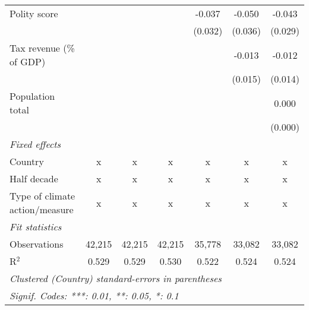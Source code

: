 \begin{tabular}{lcccccc}
   Polity score                                                       &         &         &               & -0.037        & -0.050        & -0.043\\   
                                                                      &         &         &               & (0.032)       & (0.036)       & (0.029)\\   
   Tax revenue (\% of GDP)                                            &         &         &               &               & -0.013        & -0.012\\   
                                                                      &         &         &               &               & (0.015)       & (0.014)\\   
   Population total                                                   &         &         &               &               &               & 0.000\\   
                                                                      &         &         &               &               &               & (0.000)\\   
   \emph{Fixed effects}\\
   Country                                                            & x       & x       & x             & x             & x             & x\\  
   Half decade                                                        & x       & x       & x             & x             & x             & x\\  
   Type of climate action/measure                                     & x       & x       & x             & x             & x             & x\\  
   \midrule \emph{Fit statistics}\\
   Observations                                                       & 42,215  & 42,215  & 42,215        & 35,778        & 33,082        & 33,082\\  
   R$^2$                                                              & 0.529   & 0.529   & 0.530         & 0.522         & 0.524         & 0.524\\  
   \midrule
   \multicolumn{7}{l}{\emph{Clustered (Country) standard-errors in parentheses}}\\
   \multicolumn{7}{l}{\emph{Signif. Codes: ***: 0.01, **: 0.05, *: 0.1}}\\
\end{tabular}
\par\endgroup


